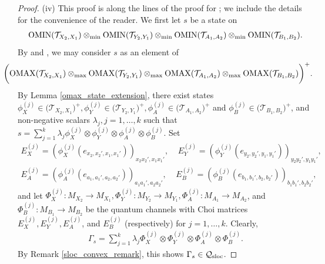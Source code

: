 \documentclass[11pt]{amsart}
\newcommand{\cl}[1]{\mathcal{#1}}
\begin{document}
\begin{proof}
(iv) This proof is along the lines of the proof for \cite[Theorem 6.7]{tt}; we include the details for the convenience of the reader. We first let $s$ be a state on
\begin{gather*}
	{\rm OMIN}(\cl{T}_{X_{2}, X_{1}})\otimes_{\rm min} {\rm OMIN}(\cl{T}_{Y_{2}, Y_{1}})\otimes_{\rm min} {\rm OMIN}(\cl{T}_{A_{1}, A_{2}})\otimes_{\rm min} {\rm OMIN}(\cl{T}_{B_{1}, B_{2}}).
\end{gather*}
\noindent By \cite[Theorem 9.9]{kavruk_thesis} and \cite[Proposition 1.9]{fp}, we may consider $s$ as an element of
\begin{gather*}
	\hspace{-0.65cm}\bigg({\rm OMAX}(\cl{T}_{X_{2}, X_{1}})\otimes_{\rm max} {\rm OMAX}(\cl{T}_{Y_{2}, Y_{1}})\otimes_{\rm max} {\rm OMAX}(\cl{T}_{A_{1}, A_{2}})\otimes_{\rm max} {\rm OMAX}(\cl{T}_{B_{1}, B_{2}})\bigg)^{+}.
\end{gather*}
\noindent By Lemma \ref{omax_state_extension}, there exist states $\phi_{X}^{(j)} \in \big(\cl{T}_{X_{2}, X_{1}}\big)^{+}, \phi_{Y}^{(j)} \in \big(\cl{T}_{Y_{2}, Y_{1}}\big)^{+}, \phi_{A}^{(j)} \in \big(\cl{T}_{A_{1}, A_{2}}\big)^{+}$ and $\phi_{B}^{(j)} \in \big(\cl{T}_{B_{1}, B_{2}}\big)^{+}$, and non-negative scalars $\lambda_{j}, j= 1, \hdots, k$ such that $s = \sum\limits_{j=1}^{k}\lambda_{j}\phi_{X}^{(j)}\otimes \phi_{Y}^{(j)}\otimes\phi_{A}^{(j)}\otimes\phi_{B}^{(j)}$. Set
\begin{gather*}
	E_{X}^{(j)} = (\phi_{X}^{(j)}(e_{x_{2}, x_{2}', x_{1}, x_{1}'}))_{x_{2}x_{2}', x_{1}x_{1}'}, \;\;\;\; E_{Y}^{(j)} = (\phi_{Y}^{(j)}(e_{y_{2}, y_{2}', y_{1}, y_{1}'}))_{y_{2}y_{2}', y_{1}y_{1}'}, 
\\	E_{A}^{(j)} = (\phi_{A}^{(j)}(e_{a_{1}, a_{1}', a_{2}, a_{2}'}))_{a_{1}a_{1}', a_{2}a_{2}'}, \;\;\;\; E_{B}^{(j)} = (\phi_{B}^{(j)}(e_{b_{1}, b_{1}', b_{2}, b_{2}'}))_{b_{1}b_{1}', b_{2}b_{2}'},
\end{gather*}
\noindent and let $\Phi_{X}^{(j)}: M_{X_{2}}\rightarrow M_{X_{1}}, \Phi_{Y}^{(j)}: M_{Y_{2}}\rightarrow M_{Y_{1}}, \Phi_{A}^{(j)}: M_{A_{1}}\rightarrow M_{A_{2}}$, and $\Phi_{B}^{(j)}: M_{B_{1}}\rightarrow M_{B_{2}}$ be the quantum channels with Choi matrices $E_{X}^{(j)}, E_{Y}^{(j)}, E_{A}^{(j)}$, and $E_{B}^{(j)}$ (respectively) for $j = 1, \hdots, k$. Clearly,
\begin{gather}\label{convex_sum_loc_channels}
	\Gamma_{s} = \sum\limits_{j=1}^{k}\lambda_{j}\Phi_{X}^{(j)}\otimes \Phi_{Y}^{(j)}\otimes \Phi_{A}^{(j)}\otimes \Phi_{B}^{(j)}.
\end{gather}
\noindent By Remark \ref{sloc_convex_remark}, this shows $\Gamma_{s} \in \cl{Q}_{\rm sloc}$.


\end{proof}
\end{document}
